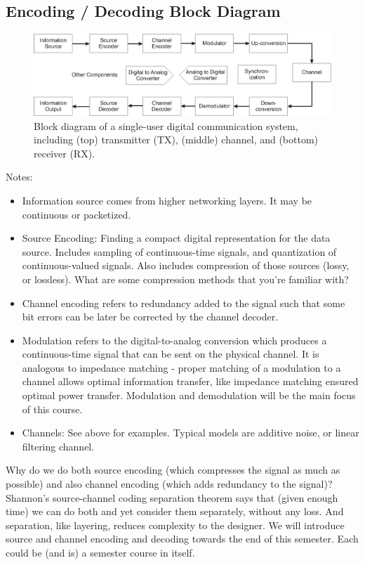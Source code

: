 \subsection{Encoding / Decoding Block Diagram}

\begin{figure}[htbp]
  \includegraphics[width=\textwidth]{../images/Tx-Channel-Rx-Block-Diagram.eps}
  \caption{Block diagram of a single-user digital communication system, including (top) transmitter (TX), (middle) channel, and (bottom) receiver (RX).}
  \label{F:Tx-Rx-Blocks}
\end{figure}

Notes:
\begin{itemize}
  \item Information source comes from higher networking layers.  It
  may be continuous or packetized.
  \item Source Encoding:  Finding a compact digital representation for
  the data source.  Includes sampling of continuous-time signals,
  and quantization of continuous-valued signals.  Also includes
  compression of those sources (lossy, or lossless).  What are some
  compression methods that you're familiar with? 
  \item Channel encoding refers to redundancy added to the signal
  such that some bit errors can be later be corrected by the channel decoder.  
  \item Modulation refers to the digital-to-analog conversion which
  produces a continuous-time signal that can be sent on the physical
  channel.  It is analogous to impedance matching - proper matching of a
  modulation to a channel allows optimal information transfer, like impedance
  matching ensured optimal power transfer.    Modulation and demodulation
  will be the main focus of this course.
  \item Channels: See above for examples.  Typical models are
  additive noise, or linear filtering channel.
\end{itemize}

Why do we do both source encoding (which compresses the signal as
much as possible) and also channel encoding (which adds redundancy
to the signal)?  Shannon's source-channel coding
separation theorem says that (given enough time) we can do both and yet
consider them separately, without any loss.  And separation,
like layering, reduces complexity to the designer.  We will introduce source and channel encoding and decoding towards the end of this semester.  Each could be (and is) a semester course in itself.


